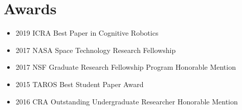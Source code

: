 \section{Awards}

\vspace{6pt}

\begin{itemize}

\item[]{2019 ICRA Best Paper in Cognitive Robotics}

\vspace{6pt}

\item[]{2017 NASA Space Technology Research Fellowship}

\vspace{6pt}

\item[]{2017 NSF Graduate Research Fellowship Program Honorable Mention}

\vspace{6pt}

\item[]{2015 TAROS Best Student Paper Award}

\vspace{6pt}

\item[]{2016 CRA Outstanding Undergraduate Researcher Honorable Mention}





\end{itemize}